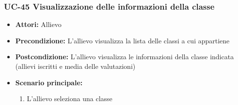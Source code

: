 		
	\subsubsection{UC-45 Visualizzazione delle informazioni della classe}
		\begin{itemize}
			\item \textbf{Attori:} Allievo
			\item \textbf{Precondizione:} L'allievo visualizza la lista delle classi a cui appartiene
			\item \textbf{Postcondizione:} L'allievo visualizza le informazioni della classe indicata (allievi iscritti e media delle valutazioni)
			\item \textbf{Scenario principale:}
			\begin{enumerate}
				\item L'allievo seleziona una classe
			\end{enumerate}
		\end{itemize}
